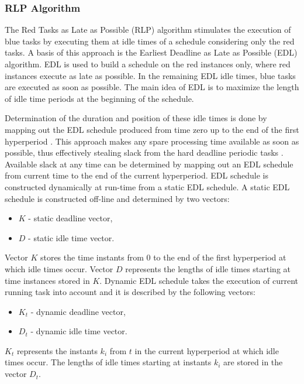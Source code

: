 \subsubsection{RLP Algorithm}
The Red Tasks as Late as Possible (RLP) algorithm stimulates the execution of blue tasks by executing them at idle times of a schedule considering only the red tasks. 
A basis of this approach is the Earliest Deadline as Late as Possible (EDL) algorithm. 
EDL is used to build a schedule on the red instances only, where red instances execute as late as possible. 
In the remaining EDL idle times, blue tasks are executed as soon as possible. 
The main idea of EDL is to maximize the length of idle time periods at the beginning of the schedule. 

Determination  of  the  duration  and  position  of  these  idle  times  is  done  by mapping out the EDL schedule produced from time zero up to the end of the first hyperperiod \cite{ghor2011real}.
This approach makes any spare processing time available as soon as possible, 
thus effectively stealing slack from the hard deadline periodic tasks 
\cite{queudet2012quality}. 
Available slack at any time can be determined by mapping out an EDL schedule from current time to the end of the current hyperperiod.
EDL schedule is constructed dynamically at run-time from a static EDL schedule.
A static EDL schedule is constructed off-line and determined by two vectors:
\begin{itemize}
	\item{$K$ - static deadline vector,}
	\item{$D$ - static idle time vector.}
\end{itemize}
Vector $K$ stores the time instants from 0 to the end of the first hyperperiod at which idle times occur. 
Vector $D$ represents the lengths of idle times starting at time instances stored in $K$. 
Dynamic EDL schedule takes the execution of current running task into account and it is described by the following vectors:
\begin{itemize}
	\item{$K_t$} - dynamic deadline vector,
	\item{$D_t$} - dynamic idle time vector.
\end{itemize}
$K_t$ represents the instants $k_i$ from $t$ in the current hyperperiod at which idle times occur. 
The lengths of idle times starting at instants $k_i$ are stored in the vector $D_t$. 


